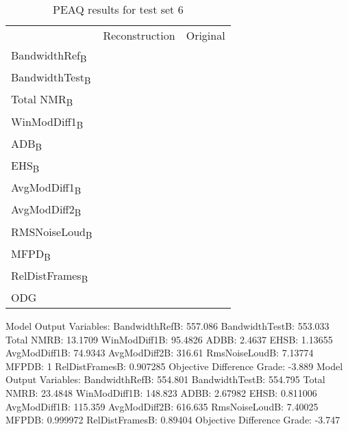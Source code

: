 \begin{table}\begin{center}
\caption{PEAQ results for test set 6}
\label{tab:PEAQdata1}
\begin{tabular}{|l|c|c|}
  \hline
                                    & Reconstruction & Original \\
  BandwidthRef\textsubscript{B}     &                & \\
  BandwidthTest\textsubscript{B}    &                & \\
  Total NMR\textsubscript{B}        &                & \\
  WinModDiff1\textsubscript{B}      &                & \\
  ADB\textsubscript{B}              &                & \\
  EHS\textsubscript{B}              &                & \\
  AvgModDiff1\textsubscript{B}      &                & \\
  AvgModDiff2\textsubscript{B}      &                & \\
  RMSNoiseLoud\textsubscript{B}     &                & \\
  MFPD\textsubscript{B}             &                & \\
  RelDistFrames\textsubscript{B}    &                & \\
  ODG                               &                & \\
  \hline
\end{tabular}
\end{center}\end{table}

Model Output Variables:
   BandwidthRefB: 557.086
  BandwidthTestB: 553.033
      Total NMRB: 13.1709
    WinModDiff1B: 95.4826
            ADBB: 2.4637
            EHSB: 1.13655
    AvgModDiff1B: 74.9343
    AvgModDiff2B: 316.61
   RmsNoiseLoudB: 7.13774
           MFPDB: 1
  RelDistFramesB: 0.907285
Objective Difference Grade: -3.889
Model Output Variables:
   BandwidthRefB: 554.801
  BandwidthTestB: 554.795
      Total NMRB: 23.4848
    WinModDiff1B: 148.823
            ADBB: 2.67982
            EHSB: 0.811006
    AvgModDiff1B: 115.359
    AvgModDiff2B: 616.635
   RmsNoiseLoudB: 7.40025
           MFPDB: 0.999972
  RelDistFramesB: 0.89404
Objective Difference Grade: -3.747


